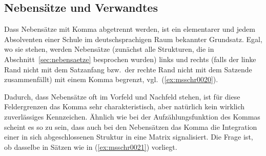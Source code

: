 \subsection{Nebensätze und Verwandtes}

\label{sec:nebensatzschreib}

Dass Nebensätze mit Komma abgetrennt werden, ist ein elementarer und jedem Absolventen einer Schule im deutschsprachigen Raum bekannter Grundsatz.
Egal, wo sie stehen, werden Nebensätze (zunächst alle Strukturen, die in Abschnitt~\ref{sec:nebensaetze} besprochen wurden) links und rechts (falls der linke Rand nicht mit dem Satzanfang bzw.\ der rechte Rand nicht mit dem Satzende zusammenfällt) mit einem Komma begrenzt, vgl.\ (\ref{ex:msschr0020}).

\begin{exe}
  \ex\label{ex:msschr0020} 
  \begin{xlist}
  \end{xlist}
\end{exe}

Dadurch, dass Nebensätze oft im Vorfeld und Nachfeld stehen, ist für diese Feldergrenzen das Komma sehr charakteristisch, aber natürlich kein wirklich zuverlässiges Kennzeichen.
Ähnlich wie bei der Aufzählungsfunktion des Kommas scheint es so zu sein, dass auch bei den Nebensätzen das Komma die Integration einer in sich abgeschlossenen Struktur in eine Matrix signalisiert.
Die Frage ist, ob dasselbe in Sätzen wie in (\ref{ex:msschr0021}) vorliegt.

\begin{exe}
  \ex\label{ex:msschr0021} 
  \begin{xlist}
  \end{xlist}
\end{exe}

